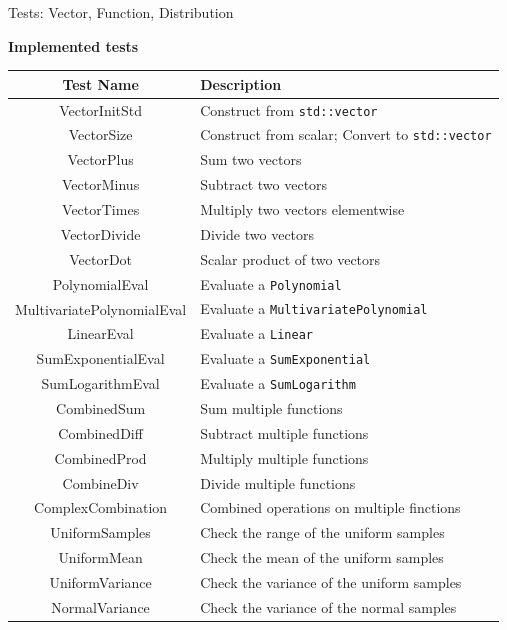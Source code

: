 \documentclass[8pt]{beamer}
\begin{document}
\begin{frame}{Tests: Vector, Function, Distribution}
    \begin{table}
        \centering
        \textbf{Implemented tests} \\
        \vfill
        \begin{tabular}{|c|l|}
            \hline
            \textbf{Test Name} & \textbf{Description} \\
            \hline
            VectorInitStd & Construct from \texttt{std::vector} \\
            VectorSize & Construct from scalar; Convert to \texttt{std::vector} \\
            VectorPlus & Sum two vectors \\
            VectorMinus & Subtract two vectors \\
            VectorTimes & Multiply two vectors elementwise \\
            VectorDivide & Divide two vectors \\
            VectorDot & Scalar product of two vectors \\
            \hline
            PolynomialEval & Evaluate a \texttt{Polynomial} \\
            MultivariatePolynomialEval & Evaluate a \texttt{MultivariatePolynomial} \\
            LinearEval &  Evaluate a \texttt{Linear} \\
            SumExponentialEval & Evaluate a \texttt{SumExponential} \\
            SumLogarithmEval & Evaluate a \texttt{SumLogarithm} \\
            \hline
            CombinedSum & Sum multiple functions \\
            CombinedDiff & Subtract multiple functions \\
            CombinedProd & Multiply multiple functions \\
            CombineDiv & Divide multiple functions \\
            ComplexCombination & Combined operations on multiple finctions \\
            \hline
            UniformSamples & Check the range of the uniform samples \\
            UniformMean & Check the mean of the uniform samples \\
            UniformVariance & Check the variance of the uniform samples \\
            NormalVariance & Check the variance of the normal samples \\
            \hline
        \end{tabular}
    \end{table}
\end{frame}
\end{document}
